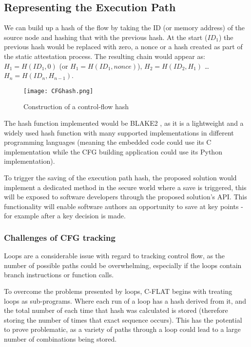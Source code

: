 \subsection{Representing the Execution Path}

We can build up a hash of the flow by taking the ID (or memory address) of the source node and hashing that with the previous hash. At the start ($ID_1$) the previous hash would be replaced with zero, a nonce or a hash created as part of the static attestation process. The resulting chain would appear as: 
$H_1 = H(ID_1,0)$ (or $H_1 = H(ID_1,nonce)$), $H_2 = H(ID_2,H_1)$ \ldots $H_n = H(ID_n,H_{n-1})$.

\begin{figure}
  \centering
  \vspace*{0.5in}
  \texttt{[image: CFGhash.png]}
  \caption{Construction of a control-flow hash}
  \label{fig:controlFlowHash}
\end{figure}

The hash function implemented would be BLAKE2 \cite{Aumasson2013}, as it is a lightweight and a widely used hash function with many supported implementations in different programming languages (meaning the embedded code could use its C implementation while the CFG building application could use its Python implementation).

To trigger the saving of the execution path hash, the proposed solution would implement a dedicated method in the secure world where a save is triggered, this will be exposed to software developers through the proposed solution's API. This functionality will enable software authors an opportunity to save at key points - for example after a key decision is made.

\subsubsection*{Challenges of CFG tracking}

Loops are a considerable issue with regard to tracking control flow, as the number of possible paths could be overwhelming, especially if the loops contain branch instructions or function calls.

To overcome the problems presented by loops, C-FLAT \cite{Abera2016} begins with treating loops as sub-programs. Where each run of a loop has a hash derived from it, and the total number of each time that hash was calculated is stored (therefore storing the number of times that exact sequence occurs). This has the potential to prove problematic, as a variety of paths through a loop could lead to a large number of combinations being stored. 

